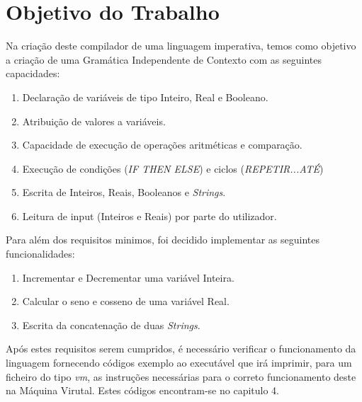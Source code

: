 \documentclass{report}
\begin{document}
\chapter{Objetivo do Trabalho}
Na criação deste compilador de uma linguagem imperativa, temos como objetivo a criação de uma Gramática Independente de Contexto com as seguintes capacidades:
\begin{enumerate}
\item Declaração de variáveis de tipo Inteiro, Real e Booleano.
\item Atribuição de valores a variáveis.
\item Capacidade de execução de operações aritméticas e comparação.
\item Execução de condições (\textit{IF THEN ELSE}) e ciclos (\textit{REPETIR...ATÉ})
\item Escrita de Inteiros, Reais, Booleanos e \textit{Strings}.
\item Leitura de input (Inteiros e Reais) por parte do utilizador.
\end{enumerate}
Para além dos requisitos minimos, foi decidido implementar as seguintes funcionalidades:
\begin{enumerate}
\item Incrementar e Decrementar uma variável Inteira.
\item Calcular o seno e cosseno de uma variável Real.
\item Escrita da concatenação de duas \textit{Strings}.
\end{enumerate}
Após estes requisitos serem cumpridos, é necessário verificar o funcionamento da linguagem fornecendo códigos exemplo ao executável que irá imprimir, para um ficheiro do tipo \textit{vm}, as instruções necessárias para o correto funcionamento deste na Máquina Virutal. Estes códigos encontram-se no capitulo 4.
\end{document}
